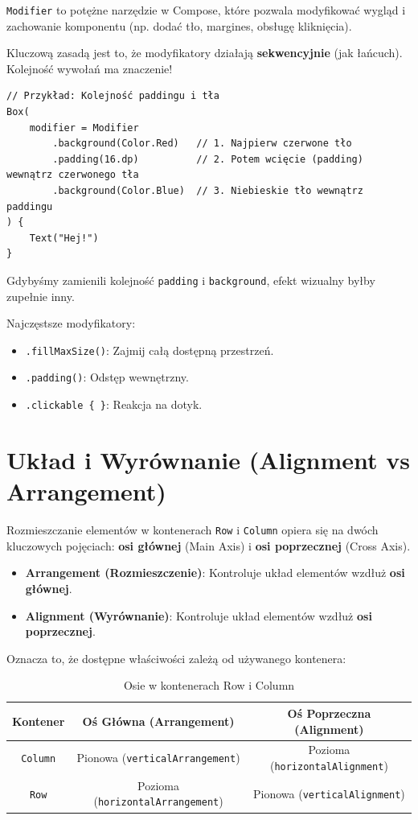 \texttt{Modifier} to potężne narzędzie w Compose, które pozwala modyfikować wygląd i zachowanie komponentu (np. dodać tło, margines, obsługę kliknięcia).

Kluczową zasadą jest to, że modyfikatory działają \textbf{sekwencyjnie} (jak łańcuch). Kolejność wywołań ma znaczenie!

\begin{verbatim}
// Przykład: Kolejność paddingu i tła
Box(
    modifier = Modifier
        .background(Color.Red)   // 1. Najpierw czerwone tło
        .padding(16.dp)          // 2. Potem wcięcie (padding) wewnątrz czerwonego tła
        .background(Color.Blue)  // 3. Niebieskie tło wewnątrz paddingu
) {
    Text("Hej!")
}
\end{verbatim}

Gdybyśmy zamienili kolejność \texttt{padding} i \texttt{background}, efekt wizualny byłby zupełnie inny.

Najczęstsze modyfikatory:
\begin{itemize}
    \item \texttt{.fillMaxSize()}: Zajmij całą dostępną przestrzeń.
    \item \texttt{.padding()}: Odstęp wewnętrzny.
    \item \texttt{.clickable \{ \}}: Reakcja na dotyk.
\end{itemize}

\section{Układ i Wyrównanie (Alignment vs Arrangement)}

Rozmieszczanie elementów w kontenerach \texttt{Row} i \texttt{Column} opiera się na dwóch kluczowych pojęciach: \textbf{osi głównej} (Main Axis) i \textbf{osi poprzecznej} (Cross Axis).

\begin{itemize}
    \item \textbf{Arrangement (Rozmieszczenie)}: Kontroluje układ elementów wzdłuż \textbf{osi głównej}.
    \item \textbf{Alignment (Wyrównanie)}: Kontroluje układ elementów wzdłuż \textbf{osi poprzecznej}.
\end{itemize}

Oznacza to, że dostępne właściwości zależą od używanego kontenera:

\begin{table}[h]
\centering
\begin{tabular}{|c|c|c|}
\hline
\textbf{Kontener} & \textbf{Oś Główna (Arrangement)} & \textbf{Oś Poprzeczna (Alignment)} \\ \hline
\texttt{Column} & Pionowa (\texttt{verticalArrangement}) & Pozioma (\texttt{horizontalAlignment}) \\ \hline
\texttt{Row} & Pozioma (\texttt{horizontalArrangement}) & Pionowa (\texttt{verticalAlignment}) \\ \hline
\end{tabular}
\caption{Osie w kontenerach Row i Column}
\label{tab:axes}
\end{table}

